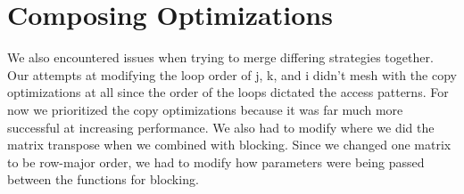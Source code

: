 \section{Composing Optimizations}\label{sec:composing}
We also encountered issues when trying to merge differing strategies together.
Our attempts at modifying the loop order of j, k, and i didn't mesh with the
copy optimizations at all since the order of the loops dictated the access
patterns. For now we prioritized the copy optimizations because it was far much
more successful at increasing performance. We also had to modify where we did
the matrix transpose when we combined with blocking. Since we changed one
matrix to be row-major order, we had to modify how parameters were being passed
between the functions for blocking.
